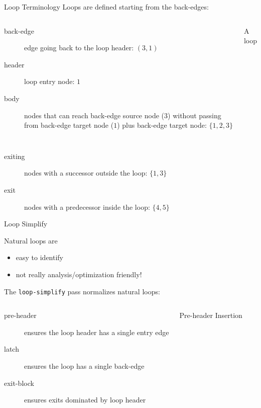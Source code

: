 \begin{frame}{Loop Terminology}
Loops are defined starting from the back-edges:

\begin{columns}[t]

\begin{description}
\item[back-edge] edge going back to the loop header: $(3,1)$
\item[header] loop entry node: $1$
\item[body] nodes that can reach back-edge source node ($3$) without passing
            from back-edge target node ($1$) plus back-edge target node:
            $\{1 ,2, 3\}$
\end{description}

\begin{block}{\small A loop}

\end{block}

\end{columns}

\begin{description}
\item[exiting] nodes with a successor outside the loop: $\{1, 3\}$
\item[exit] nodes with a predecessor inside the loop: $\{4, 5\}$
\end{description}
\end{frame}


\begin{frame}{Loop Simplify}

Natural loops are

\begin{itemize}
\item easy to \alert{identify}
\item not really analysis/optimization friendly!
\end{itemize}

\vfill
The \texttt{loop-simplify} pass normalizes natural loops:

\begin{columns}[t]
\begin{description}
\item[pre-header] ensures the \alert{loop header} has \alert{a single entry edge}
\item[latch] ensures the loop has \alert{a single back-edge}
\item[exit-block] ensures \alert{exits dominated} by loop \alert{header}
\end{description}

\vspace{-1em}
\begin{block}{Pre-header Insertion}
\centering

\end{block}
\end{columns}
\end{frame}


